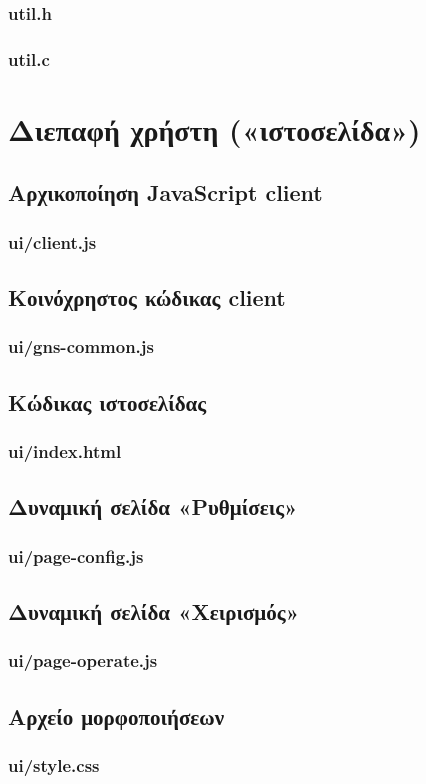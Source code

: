 \subsubsection*{util.h}

\subsubsection*{util.c}



\section{Διεπαφή χρήστη («ιστοσελίδα»)}


\subsection*{Αρχικοποίηση JavaScript client}
\subsubsection*{ui/client.js}



\subsection*{Κοινόχρηστος κώδικας client}
\subsubsection*{ui/gns-common.js}



\subsection*{Κώδικας ιστοσελίδας}
\subsubsection*{ui/index.html}
%


\subsection*{Δυναμική σελίδα «Ρυθμίσεις»}
\subsubsection*{ui/page-config.js}



\subsection*{Δυναμική σελίδα «Χειρισμός»}
\subsubsection*{ui/page-operate.js}



\subsection*{Αρχείο μορφοποιήσεων}
\subsubsection*{ui/style.css}

